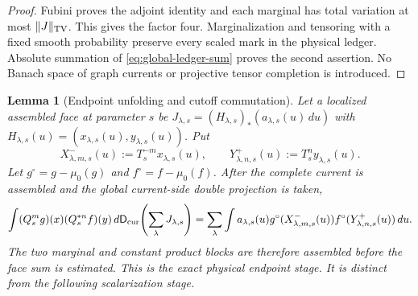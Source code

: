 \documentclass[11pt]{article}
\newtheorem{lemma}[theorem]{Lemma}
\begin{document}
\begin{proof}
Fubini proves the adjoint identity and each marginal has total variation at
most $\|J\|_{\rm TV}$.  This gives the factor four.  Marginalization and
tensoring with a fixed smooth probability preserve every scaled mark in the
physical ledger.  Absolute summation of \eqref{eq:global-ledger-sum} proves
the second assertion.  No Banach space of graph currents or projective tensor
completion is introduced.
\end{proof}

\begin{lemma}[Endpoint unfolding and cutoff commutation]
\label{lem:endpoint-unfolding}
Let a localized assembled face at parameter $s$ be
$J_{\lambda,s}=(H_{\lambda,s})_*(a_{\lambda,s}(u)\,du)$ with
$H_{\lambda,s}(u)=(x_{\lambda,s}(u),y_{\lambda,s}(u))$.  Put
\begin{equation}
\label{eq:physical-endpoint-maps}
 X^-_{\lambda,m,s}(u):=T_s^{-m}x_{\lambda,s}(u),\qquad
 Y^+_{\lambda,n,s}(u):=T_s^{n}y_{\lambda,s}(u).
\end{equation}
Let $g^\circ=g-\mu_0(g)$ and $f^\circ=f-\mu_0(f)$.  After the complete
current is assembled and the global current-side double projection is taken,
\begin{equation}
\label{eq:exact-endpoint-unfolding}
 \int (Q_s^mg)(x)(Q_s^{*n}f)(y)\,
       d\mathsf D_{\rm cur}\!\left(\sum_\lambda J_{\lambda,s}\right)
 =\sum_\lambda\int a_{\lambda,s}(u)
   g^\circ(X^-_{\lambda,m,s}(u))
   f^\circ(Y^+_{\lambda,n,s}(u))\,du.
\end{equation}
The two marginal and constant product blocks are therefore assembled before
the face sum is estimated.  This is the exact \emph{physical endpoint}
stage.  It is distinct from the following scalarization stage.


\end{lemma}
\end{document}
